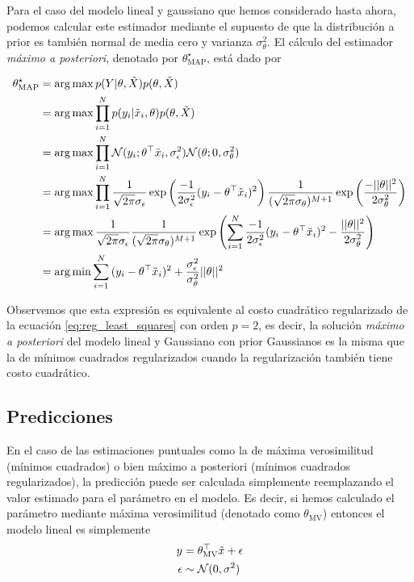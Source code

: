 Para el caso del modelo lineal y gaussiano que hemos considerado hasta ahora, podemos calcular este estimador mediante el supuesto de que la distribución a prior es también normal de media cero y varianza $\sigma_\theta^2$. El cálculo del estimador \emph{máximo a posteriori}, denotado por $\theta_\text{MAP}^\star $, está dado por 

\begin{align}
	\theta_\text{MAP}^\star 	&= \operatorname*{arg\,max} p(Y|\theta,\tilde{X})p(\theta,\tilde{X})\nonumber\\
								&= \operatorname*{arg\,max} \prod_{i=1}^Np(y_i|\tilde{x}_i,\theta)p(\theta,\tilde{X})\nonumber\\
								&= \operatorname*{arg\,max} \prod_{i=1}^N {\mathcal N}(y_i;\theta^\top\tilde{x}_i,\sigma_\epsilon^2){\mathcal N}(\theta;0,\sigma_\theta^2) \nonumber\\
								&= \operatorname*{arg\,max} \prod_{i=1}^N \frac{1}{\sqrt{2\pi}\sigma_\epsilon} \exp\left({\frac{-1}{2\sigma_\epsilon^2}(y_i-\theta^\top\tilde{x}_i)^2}\right)
											\frac{1}{(\sqrt{2\pi}\sigma_\theta)^{M+1}} \exp\left({\frac{-||\theta||^2}{2\sigma_\theta^2}}\right) \nonumber\\
								&= \operatorname*{arg\,max}  \frac{1}{\sqrt{2\pi}\sigma_\epsilon} \frac{1}{(\sqrt{2\pi}\sigma_\theta)^{M+1}}
											\exp\left( \sum_{i=1}^N{\frac{-1}{2\sigma_\epsilon^2}(y_i-\theta^\top\tilde{x}_i)^2} -{\frac{||\theta||^2}{2\sigma_\theta^2}}\right) \nonumber\\
								&= \operatorname*{arg\,min} \sum_{i=1}^N{(y_i-\theta^\top\tilde{x}_i)^2} +{\frac{\sigma_\epsilon^2}{\sigma_\theta^2}||\theta||^2}
\end{align}

Observemos que esta expresión es equivalente al costo cuadrático regularizado de la ecuación \eqref{eq:reg_least_squares} con orden $p=2$, es decir, la solución \emph{máximo a posteriori} del modelo lineal y Gaussiano con prior Gaussianos es la misma que la de mínimos cuadrados regularizados cuando la regularización también tiene costo cuadrático. 


\subsection{Predicciones} %
\label{sub:predicciones}
En el caso de las estimaciones puntuales como la de máxima verosimilitud (mínimos cuadrados) o bien máximo a posteriori (mínimos cuadrados regularizados), la predicción puede ser calculada simplemente reemplazando el valor estimado para el parámetro en el modelo. Es decir, si hemos calculado el parámetro mediante máxima verosimilitud (denotado como $\theta_{\text{MV}}$) entonces el modelo lineal es simplemente 
\begin{align}
	 y &= \theta_{\text{MV}}^\top \tilde{x} + \epsilon\\
	 \epsilon &\sim {\mathcal N}(0,\sigma^2)
\end{align}


